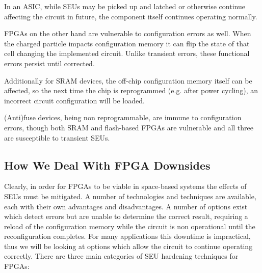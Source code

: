 \documentclass[12pt,final,oneside,a4paper]{dwThesis} %
\begin{document}
   In an \gls{ASIC}, while \glspl{SEU} may be picked up and latched or
   otherwise continue affecting the circuit in future, the component itself
   continues operating normally.

   \glspl{FPGA} on the other hand are vulnerable to configuration errors as
   well. When the charged particle impacts configuration memory it can flip the
   state of that cell changing the implemented circuit. Unlike transient
   errors, these functional errors persist until corrected.

   Additionally for \gls{SRAM} devices, the off-chip configuration memory
   itself can be affected, so the next time the chip is reprogrammed (e.g.
   after power cycling), an incorrect circuit configuration will be loaded.

   (Anti)fuse devices, being non reprogrammable, are immune to configuration
   errors, though both \gls{SRAM} and flash-based \glspl{FPGA} are vulnerable
   and all three are susceptible to transient \glspl{SEU}\cite{HFPP}.


   \subsection{How We Deal With \gls{FPGA}
      Downsides} Clearly, in order for
   \glspl{FPGA} to be viable in space-based systems the effects of \glspl{SEU}
   must be mitigated. A number of technologies and techniques are available,
   each with their own advantages and disadvantages. A number of options exist
   which detect errors but are unable to determine the correct result,
   requiring a reload of the configuration memory while the circuit is non
   operational until the reconfiguration completes. For many applications this
   downtime is impractical, thus we will be looking at options which allow the
   circuit to continue operating correctly.  There are three main categories of
   \gls{SEU} hardening techniques for \glspl{FPGA}\cite{HardeningTechniques}:
\end{document}

